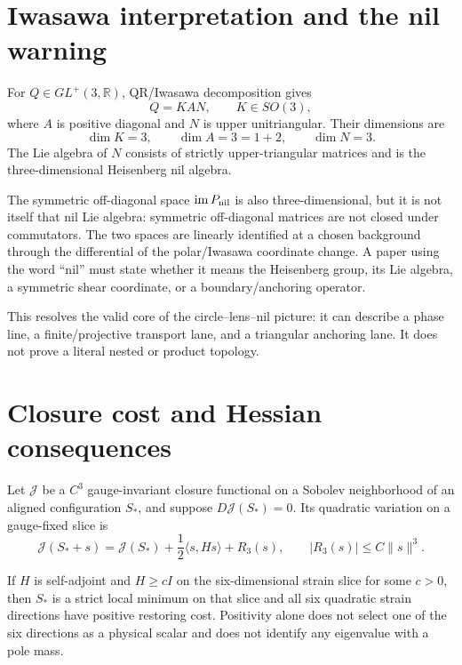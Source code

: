 \documentclass[11pt]{article}
\begin{document}
\section{Iwasawa interpretation and the nil warning}

For $Q\in GL^+(3,\mathbb R)$, QR/Iwasawa decomposition gives
\[
 Q=KAN,
 \qquad K\in SO(3),
\]
where $A$ is positive diagonal and $N$ is upper unitriangular.  Their
dimensions are
\[
 \dim K=3,
 \qquad \dim A=3=1+2,
 \qquad \dim N=3.
\]
The Lie algebra of $N$ consists of strictly upper-triangular matrices and is
the three-dimensional Heisenberg nil algebra.

The symmetric off-diagonal space $\operatorname{im}P_{\rm nil}$ is also
three-dimensional, but it is not itself that nil Lie algebra: symmetric
off-diagonal matrices are not closed under commutators.  The two spaces are
linearly identified at a chosen background through the differential of the
polar/Iwasawa coordinate change.  A paper using the word ``nil'' must state
whether it means the Heisenberg group, its Lie algebra, a symmetric shear
coordinate, or a boundary/anchoring operator.

This resolves the valid core of the circle--lens--nil picture: it can describe
a phase line, a finite/projective transport lane, and a triangular anchoring
lane.  It does not prove a literal nested or product topology.

\section{Closure cost and Hessian consequences}

Let $\mathcal J$ be a $C^3$ gauge-invariant closure functional on a Sobolev
neighborhood of an aligned configuration $S_\ast$, and suppose
$D\mathcal J(S_\ast)=0$.  Its quadratic variation on a gauge-fixed slice is
\[
 \mathcal J(S_\ast+s)
 =\mathcal J(S_\ast)
 +\frac12\langle s,Hs\rangle+R_3(s),
 \qquad |R_3(s)|\le C\|s\|^3.
\]

\begin{theorem}
If $H$ is self-adjoint and $H\ge cI$ on the six-dimensional strain slice for
some $c>0$, then $S_\ast$ is a strict local minimum on that slice and all six
quadratic strain directions have positive restoring cost.  Positivity alone
does not select one of the six directions as a physical scalar and does not
identify any eigenvalue with a pole mass.
\end{theorem}
\end{document}

